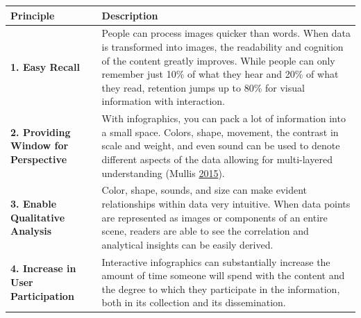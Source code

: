 \documentclass[]{book}
\begin{document}
\begin{longtable}[]{@{}ll@{}}
\toprule
\begin{minipage}[b]{0.15\columnwidth}\raggedright
\textbf{Principle}\strut
\end{minipage} & \begin{minipage}[b]{0.79\columnwidth}\raggedright
\textbf{Description}\strut
\end{minipage}\tabularnewline
\midrule
\endhead
\begin{minipage}[t]{0.15\columnwidth}\raggedright
\textbf{1. Easy Recall}\strut
\end{minipage} & \begin{minipage}[t]{0.79\columnwidth}\raggedright
People can process images quicker than words. When data is transformed into images, the readability and cognition of the content greatly improves. While people can only remember just 10\% of what they hear and 20\% of what they read, retention jumps up to 80\% for visual information with interaction.\strut
\end{minipage}\tabularnewline
\begin{minipage}[t]{0.15\columnwidth}\raggedright
\textbf{2. Providing Window for Perspective}\strut
\end{minipage} & \begin{minipage}[t]{0.79\columnwidth}\raggedright
With infographics, you can pack a lot of information into a small space. Colors, shape, movement, the contrast in scale and weight, and even sound can be used to denote different aspects of the data allowing for multi-layered understanding (Mullis \protect\hyperlink{ref-image_good}{2015}).\strut
\end{minipage}\tabularnewline
\begin{minipage}[t]{0.15\columnwidth}\raggedright
\textbf{3. Enable Qualitative Analysis}\strut
\end{minipage} & \begin{minipage}[t]{0.79\columnwidth}\raggedright
Color, shape, sounds, and size can make evident relationships within data very intuitive. When data points are represented as images or components of an entire scene, readers are able to see the correlation and analytical insights can be easily derived.\strut
\end{minipage}\tabularnewline
\begin{minipage}[t]{0.15\columnwidth}\raggedright
\textbf{4. Increase in User Participation}\strut
\end{minipage} & \begin{minipage}[t]{0.79\columnwidth}\raggedright
Interactive infographics can substantially increase the amount of time someone will spend with the content and the degree to which they participate in the information, both in its collection and its dissemination.\strut
\end{minipage}\tabularnewline
\bottomrule
\end{longtable}
\end{document}
